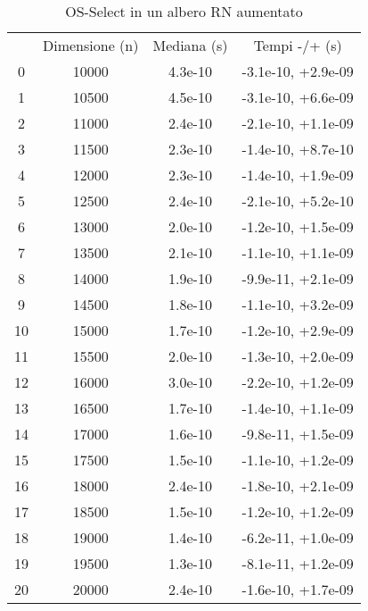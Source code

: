 \begin{table}
\centering
\caption{OS-Select in un albero RN aumentato}
\label{OS-Select in un albero RN aumentato}
\begin{adjustbox}{width=1\textwidth/2}
\begin{tabular}{|c|c|c|c|}
\hline
 & Dimensione (n) & Mediana (s) & Tempi -/+ (s) \\
0 & 10000 & 4.3e-10 & -3.1e-10, +2.9e-09 \\
\cline{1-4}
1 & 10500 & 4.5e-10 & -3.1e-10, +6.6e-09 \\
\cline{1-4}
2 & 11000 & 2.4e-10 & -2.1e-10, +1.1e-09 \\
\cline{1-4}
3 & 11500 & 2.3e-10 & -1.4e-10, +8.7e-10 \\
\cline{1-4}
4 & 12000 & 2.3e-10 & -1.4e-10, +1.9e-09 \\
\cline{1-4}
5 & 12500 & 2.4e-10 & -2.1e-10, +5.2e-10 \\
\cline{1-4}
6 & 13000 & 2.0e-10 & -1.2e-10, +1.5e-09 \\
\cline{1-4}
7 & 13500 & 2.1e-10 & -1.1e-10, +1.1e-09 \\
\cline{1-4}
8 & 14000 & 1.9e-10 & -9.9e-11, +2.1e-09 \\
\cline{1-4}
9 & 14500 & 1.8e-10 & -1.1e-10, +3.2e-09 \\
\cline{1-4}
10 & 15000 & 1.7e-10 & -1.2e-10, +2.9e-09 \\
\cline{1-4}
11 & 15500 & 2.0e-10 & -1.3e-10, +2.0e-09 \\
\cline{1-4}
12 & 16000 & 3.0e-10 & -2.2e-10, +1.2e-09 \\
\cline{1-4}
13 & 16500 & 1.7e-10 & -1.4e-10, +1.1e-09 \\
\cline{1-4}
14 & 17000 & 1.6e-10 & -9.8e-11, +1.5e-09 \\
\cline{1-4}
15 & 17500 & 1.5e-10 & -1.1e-10, +1.2e-09 \\
\cline{1-4}
16 & 18000 & 2.4e-10 & -1.8e-10, +2.1e-09 \\
\cline{1-4}
17 & 18500 & 1.5e-10 & -1.2e-10, +1.2e-09 \\
\cline{1-4}
18 & 19000 & 1.4e-10 & -6.2e-11, +1.0e-09 \\
\cline{1-4}
19 & 19500 & 1.3e-10 & -8.1e-11, +1.2e-09 \\
\cline{1-4}
20 & 20000 & 2.4e-10 & -1.6e-10, +1.7e-09 \\
\cline{1-4}
\end{tabular}
\end{adjustbox}
\end{table}

